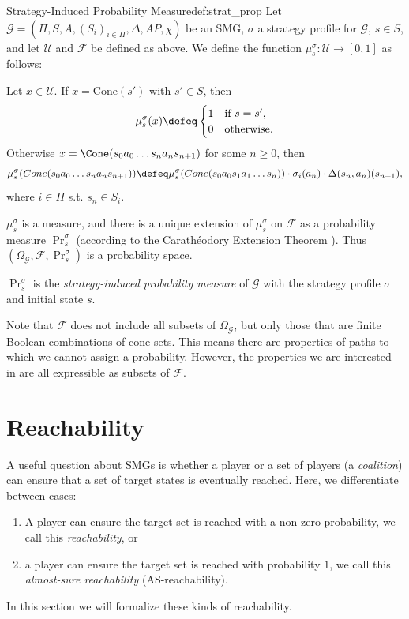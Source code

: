 \begin{mydefinition}{Strategy-Induced Probability Measure}{def:strat_prop}
Let $\mathcal{G} = (\Pi, S, A, (S_i)_{i \in \Pi}, \Delta, AP, \chi)$ be an SMG, $\sigma$ a strategy profile for $\mathcal{G}$, $s \in S$, and let $\mathcal{U}$ and $\mathcal{F}$ be defined as above. We define the function $\mu_s^\sigma: \mathcal{U} \rightarrow [0, 1]$ as follows:

Let $x \in \mathcal{U}$. If $x = \text{Cone}(s')$ with $s' \in S$, then
\[
\mu_s^\sigma(x) \defeq
\begin{cases}
1 & \text{if } s = s', \\
0 & \text{otherwise.}
\end{cases}
\]
Otherwise $x = \Cone(s_0 a_0 \dots s_n a_n s_{n+1})$ for some $n \geq 0$, then
\[
\mu_s^\sigma(Cone(s_0 a_0 \dots s_n a_n s_{n+1})) \defeq \mu_s^\sigma(Cone(s_0 a_0 s_1 a_1 \dots s_n)) \cdot \sigma_i(a_n) \cdot \Delta(s_n, a_n)(s_{n+1}),
\]
where $i\in\Pi$ s.t. $s_n \in S_i$.

$\mu_s^\sigma$ is a measure, and there is a unique extension of $\mu_s^\sigma$ on $\mathcal{F}$ as a probability measure $\Pr_s^\sigma$ (according to the Carath\'eodory Extension Theorem \cite[Theorem 11.2]{billingsley_probability_1995}). Thus $(\Omega_\mathcal{G}, \mathcal{F}, \Pr_s^\sigma)$ is a probability space.

$\Pr_s^\sigma$ is the \textit{strategy-induced probability measure} of $\mathcal{G}$ with the strategy profile $\sigma$ and initial state $s$.
\end{mydefinition}

Note that $\mathcal{F}$ does not include all subsets of $\Omega_\mathcal{G}$, but only those that are finite Boolean combinations of cone sets. This means there are properties of paths to which we cannot assign a probability. However, the properties we are interested in are all expressible as subsets of $\mathcal{F}$.


\section{Reachability}

A useful question about SMGs is whether a player or a set of players (a \textit{coalition}) can ensure that a set of target states is eventually reached. Here, we differentiate between cases:
\begin{enumerate}
    \item A player can ensure the target set is reached with a non-zero probability, we call this \textit{reachability}, or
    \item a player can ensure the target set is reached with probability $1$, we call this \textit{almost-sure reachability} (AS-reachability).
\end{enumerate}
In this section we will formalize these kinds of reachability.

